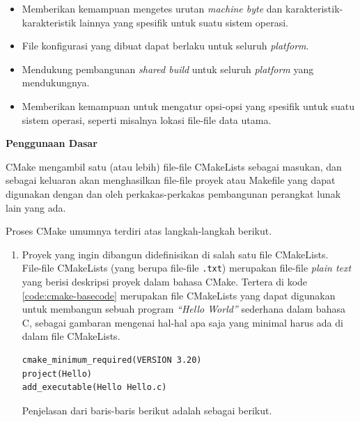 \documentclass[a4paper,twoside]{article}
\begin{document}
\begin{enumerate}
\begin{itemize}
	\item Memberikan kemampuan mengetes urutan \textit{machine byte} dan karakteristik-karakteristik lainnya yang spesifik untuk suatu sistem operasi.
	\item File konfigurasi yang dibuat dapat berlaku untuk seluruh \textit{platform}.
	\item Mendukung pembangunan \textit{shared build} untuk seluruh \textit{platform} yang mendukungnya.
	\item Memberikan kemampuan untuk mengatur opsi-opsi yang spesifik untuk suatu sistem operasi, seperti misalnya lokasi file-file data utama.
\end{itemize}

\textbf{Penggunaan Dasar}
\label{sec:cmodules-CMake-basicusage}

CMake mengambil satu (atau lebih) file-file CMakeLists sebagai masukan, dan sebagai keluaran akan menghasilkan file-file proyek atau Makefile yang dapat digunakan dengan dan oleh perkakas-perkakas pembangunan perangkat lunak lain yang ada.

Proses CMake umumnya terdiri atas langkah-langkah berikut.

\begin{enumerate}
	\item Proyek yang ingin dibangun didefinisikan di salah satu file CMakeLists.\\
	File-file CMakeLists (yang berupa file-file \verb|.txt|) merupakan file-file \textit{plain text} yang berisi deskripsi proyek dalam bahasa CMake. Tertera di kode \ref{code:cmake-basecode} merupakan file CMakeLists yang dapat digunakan untuk membangun sebuah program \textit{``Hello World''} sederhana dalam bahasa C, sebagai gambaran mengenai hal-hal apa saja yang minimal harus ada di dalam file CMakeLists.
	
	\begin{lstlisting}[caption=Kode utama operasional CMakeLists, label=code:cmake-basecode]
cmake_minimum_required(VERSION 3.20)
project(Hello)
add_executable(Hello Hello.c)
	\end{lstlisting}
	
	Penjelasan dari baris-baris berikut adalah sebagai berikut.
	

\end{enumerate}
\end{enumerate}
\end{document}
